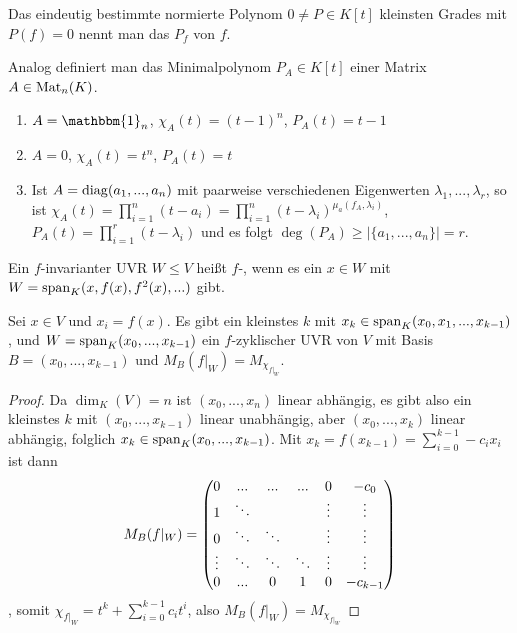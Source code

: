 \begin{definition}[Minimalpolynom]
	Das eindeutig bestimmte normierte Polynom $0\neq P\in K[t]$ kleinsten Grades mit $P(f)=0$ nennt man das  $P_f$ von $f$.
	
	Analog definiert man das Minimalpolynom $P_A\in K[t]$ einer Matrix $A\in\operatorname{Mat}_n(K)$.
\end{definition}

\begin{example}
	\begin{enumerate}
		\item $A=\mathbbm{1}_n$, $\chi_A(t)=(t-1)^n$, $P_A(t)=t-1$
		\item $A=0$, $\chi_A(t)=t^n$, $P_A(t)=t$
		\item Ist $A=\operatorname{diag}(a_1,...,a_n)$ mit paarweise verschiedenen Eigenwerten $\lambda_1,...,\lambda_r$, so ist $\chi_A(t)=\prod\limits_{i=1}^n (t-a_i)=\prod\limits_{i=1}^n (t-\lambda_i)^{\mu_a(f_A,\lambda_i)}$, $P_A(t)=\prod\limits_{i=1}^r (t-\lambda_i)$ und es folgt $\deg(P_A)\ge \vert \{a_1,...,a_n\}\vert=r$.
	\end{enumerate}
\end{example}

\begin{definition}[$f$-zyklisch]
	Ein $f$-invarianter UVR $W\le V$ heißt $f$-, wenn es ein $x\in W$ mit $W=\operatorname{span}_K(x,f(x),f^2(x),...)$ gibt.
\end{definition}

\begin{lemma}
	Sei $x\in V$ und $x_i=f(x)$. Es gibt ein kleinstes $k$ mit $x_k\in\operatorname{span}_K(x_0,x_1,...,x_{k-1})$, und $W=\operatorname{span}_K(x_0,...,x_{k-1})$ ein $f$-zyklischer UVR von $V$ mit Basis $B=(x_0,...,x_{k-1})$ und $M_B(f\vert_W)=M_{\chi_{f\vert_W}}$.
\end{lemma}
\begin{proof}
	Da $\dim_K(V)=n$ ist $(x_0,...,x_n)$ linear abhängig, es gibt also ein kleinstes $k$ mit $(x_0,...,x_{k-1})$ linear unabhängig, aber $(x_0,...,x_k)$ linear abhängig, folglich $x_k\in\operatorname{span}_K(x_0,...,x_{k-1})$. Mit $x_k=f(x_{k-1})=\sum\limits_{i=0}^{k-1}-c_ix_i$ ist dann 
	\begin{align}
		M_B(f\vert_W)=\begin{pmatrix}0&...&...&...&0&-c_0\\
		1&\ddots&\;&\;&\vdots&\vdots\\
		0&\ddots&\ddots&\;&\vdots&\vdots\\
		\vdots&\ddots&\ddots&\ddots&\vdots&\vdots\\
		0&...&0&1&0&-c_{k-1}\end{pmatrix}\notag
	\end{align},
	somit $\chi_{f\vert_W}=t^k+\sum\limits_{i=0}^{k-1}c_it^i$, also $M_B(f\vert_W)=M_{\chi_{f\vert_W}}$
\end{proof}

